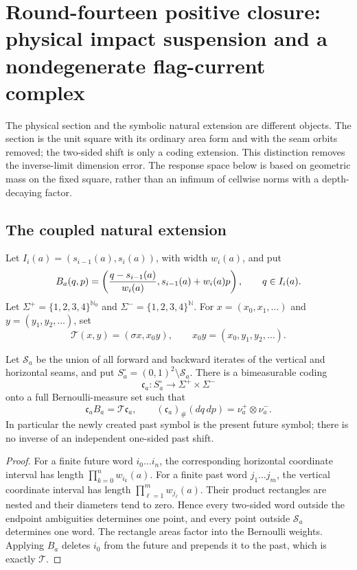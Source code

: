 
\section{Round-fourteen positive closure: physical impact suspension and a nondegenerate flag-current complex}
\label{sec:r14-a1}

The physical section and the symbolic natural extension are different objects.
The section is the unit square with its ordinary area form and with the seam
orbits removed; the two-sided shift is only a coding extension.  This
distinction removes the inverse-limit dimension error.  The response space
below is based on geometric mass on the fixed square, rather than an infimum
of cellwise norms with a depth-decaying factor.

\subsection{The coupled natural extension}

Let \(I_i(a)=(s_{i-1}(a),s_i(a))\), with width \(w_i(a)\), and put
\[
 B_a(q,p)=\left({q-s_{i-1}(a)\over w_i(a)},
                s_{i-1}(a)+w_i(a)p\right),
 \qquad q\in I_i(a).
\]
Let \(\Sigma^+=\{1,2,3,4\}^{\mathbb N_0}\) and
\(\Sigma^-=\{1,2,3,4\}^{\mathbb N}\).  For
\(x=(x_0,x_1,\ldots)\) and \(y=(y_1,y_2,\ldots)\), set
\[
 {\mathcal T}(x,y)=(\sigma x,x_0y),
 \qquad x_0y=(x_0,y_1,y_2,\ldots).
\]

\begin{theorem}
\label{thm:r14-a1-coding}
Let \(\mathcal S_a\) be the union of all forward and backward iterates of
the vertical and horizontal seams, and put
\(S_a^\circ=(0,1)^2\setminus\mathcal S_a\).  There is a bimeasurable coding
\[
 \mathfrak c_a:S_a^\circ\longrightarrow
 \Sigma^+\times\Sigma^-
\]
onto a full Bernoulli-measure set such that
\[
 \mathfrak c_a B_a={\mathcal T}\mathfrak c_a,
 \qquad
 (\mathfrak c_a)_\#(dq\,dp)=\nu_a^+\otimes\nu_a^- .
\]
In particular the newly created past symbol is the present future symbol;
there is no inverse of an independent one-sided past shift.
\end{theorem}

\begin{proof}
For a finite future word \(i_0\ldots i_n\), the corresponding horizontal
coordinate interval has length \(\prod_{k=0}^n w_{i_k}(a)\).  For a finite
past word \(j_1\ldots j_m\), the vertical coordinate interval has length
\(\prod_{\ell=1}^m w_{j_\ell}(a)\).  Their product rectangles are nested and
their diameters tend to zero.  Hence every two-sided word outside the endpoint
ambiguities determines one point, and every point outside \(\mathcal S_a\)
determines one word.  The rectangle areas factor into the Bernoulli weights.
Applying \(B_a\) deletes \(i_0\) from the future and prepends it to the past,
which is exactly \({\mathcal T}\).
\end{proof}


